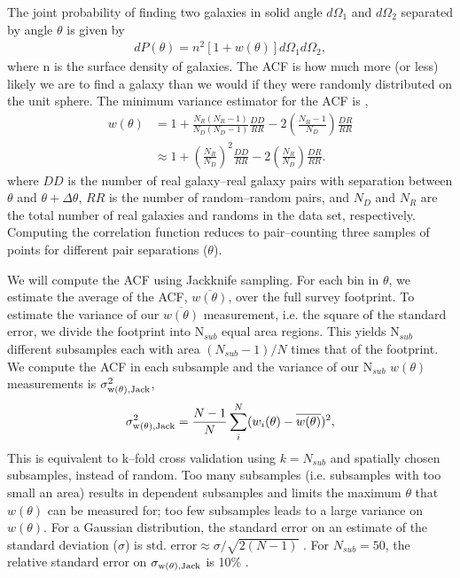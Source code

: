 \documentclass[a4paper,fleqn,usenatbib]{mnras}
\newcommand{\lp}{\left(}
\newcommand{\rp}{\right)}
\begin{document}
The joint probability of finding two galaxies in solid angle $d\Omega_1$ and $d\Omega_2$ separated by angle $\theta$ is given by \citep{peebles1980, corrfuncIC}
\begin{align}
dP(\theta)= n^2 [1+w(\theta) ] d\Omega_1 d\Omega_2,
\end{align}
\noindent where n is the surface density of galaxies. The ACF is how much more (or less) likely we are to find a galaxy than we would if they were randomly distributed on the unit sphere. The minimum variance estimator for the ACF is \citep{landy93},  
\begin{align}
w(\theta) &= 1 + \frac{N_R (N_R - 1)}{N_D (N_D - 1)} \frac{DD}{RR} - 2\lp \frac{N_R-1}{N_D} \rp \frac{DR}{RR} \nonumber \\
&\approx 1 + \lp \frac{N_R}{N_D} \rp^2 \frac{DD}{RR} - 2\lp \frac{N_R }{N_D} \rp \frac{DR}{RR} 
\label{eqn:landy93}.
\end{align}
where $DD$ is the number of real galaxy--real galaxy pairs with separation between $\theta$ and $\theta + \Delta \theta$, $RR$ is the number of random--random pairs, and $N_D$ and $N_R$ are the total number of real galaxies and randoms in the data set, respectively. Computing the correlation function reduces to pair--counting three samples of points for different pair separations ($\theta$).

We will compute the ACF using Jackknife sampling. For each bin in $\theta$, we estimate the average of the ACF, $\overline{w(\theta)}$, over the full survey footprint. To estimate the variance of our $\overline{w(\theta)}$ measurement, i.e. the square of the standard error, we divide the footprint into N$_{sub}$ equal area regions. This yields N$_{sub}$ different subsamples each with area $(N_{sub} - 1) / N$ times that of the footprint. We compute the ACF in each subsample and the variance of our N$_{sub}$ $w(\theta)$ measurements is $\sigma_{\rm{w(\theta), Jack}}^2$,
\begin{align}
\sigma_{\rm{w(\theta), Jack}}^2 = \frac{N-1}{N}\sum_i^N (w_i(\theta) - \overline{w(\theta)})^2,
\end{align}
\noindent This is equivalent to k--fold cross validation using $k=N_{sub}$ and spatially chosen subsamples, instead of random. Too many subsamples (i.e. subsamples with too small an area) results in dependent subsamples and limits the maximum $\theta$ that $w(\theta)$ can be measured for; too few subsamples leads to a large variance on $w(\theta)$. For a Gaussian distribution, the standard error on an estimate of the standard deviation ($\sigma$) is $\text{std. error} \approx \sigma/\sqrt{2(N-1)}$ \citep{stderrVar}. For $N_{sub}=50$, the relative standard error on $\sigma_{\rm{w(\theta), Jack}}$ is 10\% \citep{corrfuncErrors}.
\end{document}

